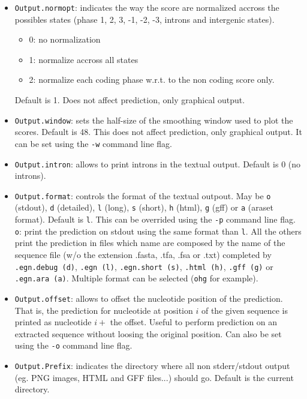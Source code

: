 \documentclass[a4paper,titlepage]{report}
\begin{document}
\begin{itemize}
\item \texttt{Output.normopt}: indicates the way the score are
  normalized accross the possibles states (phase 1, 2, 3, -1, -2, -3,
  introns and intergenic states).
  \begin{itemize}
  \item 0: no normalization
  \item 1: normalize accross all states
  \item 2: normalize each coding phase w.r.t. to the non coding
    score only.
  \end{itemize}
  Default is 1. Does not affect prediction, only graphical output.

\item \texttt{Output.window}: sets the half-size of the smoothing
  window used to plot the scores.  Default is 48. This does not affect
  prediction, only graphical output. It can be set using the
  \texttt{-w} command line flag. 

\item \texttt{Output.intron}: allows to print introns in the textual output.
  Default is 0 (no introns).
 
\item \texttt{Output.format}: controls the format of the textual
  outpout. May be \texttt{o} (stdout), \texttt{d} (detailed), \texttt{l} (long),
  \texttt{s} (short), \texttt{h} (html), \texttt{g} (gff) or \texttt{a} (araset
  format). Default is \texttt{l}. This can be overrided using the
  \texttt{-p} command line flag.
  \texttt{o}: print the prediction on stdout using the same format than \texttt{l}.
  All the others print the prediction in files which name are composed by the 
  name of the sequence file (w/o the extension .fasta, .tfa, .fsa or .txt) completed by
  \texttt{.egn.debug (d)}, \texttt{.egn (l)}, \texttt{.egn.short (s)},
  \texttt{.html (h)}, \texttt{.gff (g)} or \texttt{.egn.ara (a)}.
  Multiple format can be selected (\texttt{ohg} for example).
  
\item \texttt{Output.offset}: allows to offset the nucleotide position
  of the prediction.  That is, the prediction for nucleotide at
  position $i$ of the given sequence is printed as nucleotide $i+$ the
  offset. Useful to perform prediction on an extracted sequence
  without loosing the original position. Can also be set using the
  \texttt{-o} command line flag. 
  
\item \texttt{Output.Prefix}: indicates the directory where all non
  stderr/stdout output (eg. PNG images, HTML and GFF files...) should go.
  Default is the current directory.
\end{itemize}
\end{document}
